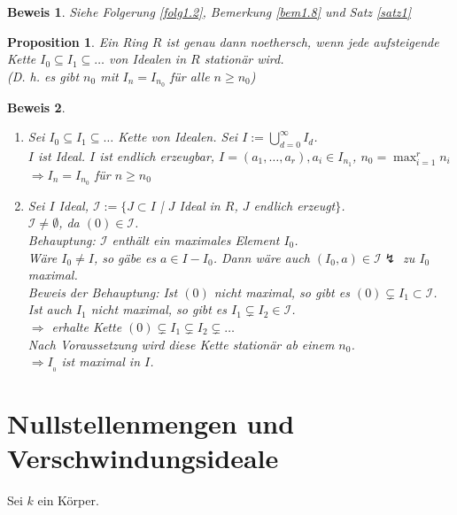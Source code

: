 \documentclass[a4paper,12pt]{report}
\theoremstyle{break}
\newtheorem{Prop}[Def]{Proposition}
\theoremstyle{nonumberbreak}
\newtheorem{Bew}{Beweis}
\theoremstyle{nonumberplain}
\newcommand{\quot}[1]{\textrm{\glqq}{#1}\textrm{\grqq}}
\newenvironment{twosidedproof}{\begin{enumerate}[\quot{$\Rightarrow$}:]}{\end{enumerate}}
\newcommand{\proofforward}{\item[\quot{$\Rightarrow$}:]}
\newcommand{\proofreverse}{\item[\quot{$\Leftarrow$}:]}
\begin{document}
\begin{Bew}
Siehe Folgerung \ref{folg1.2}, Bemerkung \ref{bem1.8} und Satz \ref{satz1}
\end{Bew}

\begin{Prop}
Ein Ring $R$ ist genau dann noethersch, wenn jede aufsteigende Kette $I_0 \subseteq I_1 \subseteq \dots$ von Idealen in $R$ station\"ar wird.\\
(D. h. es gibt $n_0$ mit $I_n=I_{n_0}$ f\"ur alle $n\ge n_0$)
\end{Prop}

\begin{Bew}\begin{twosidedproof}
\proofforward
	Sei $I_0 \subseteq I_1 \subseteq \dots $ Kette von Idealen. Sei $I:= \bigcup_{d=0}^{\infty} I_d$.\\
	$I$ ist Ideal. $I$ ist endlich erzeugbar, $I=(a_1,\dots ,a_r),a_i \in I_{n_1}$, $n_0=\max_{i=1}^r n_i$\\
	$\Rightarrow I_n = I_{n_0}$ f\"ur $n \ge n_0$
	
\proofreverse
	Sei $I$ Ideal, $\mathcal{I}:=\{ J\subset I$ | $J$ Ideal in $R$, $J$ endlich erzeugt$\}$.\\
	$\mathcal{I} \not= \emptyset$, da $(0)\in \mathcal{I}$.\\
	\emph{Behauptung:} $\mathcal{I}$ enth\"alt ein maximales Element $I_0$.\\
	W\"are $I_0 \not= I$, so g\"abe es $a\in I - I_0$. Dann w\"are auch $(I_0,a)\in \mathcal{I} \lightning$ zu $I_0$ maximal.\\
	\emph{Beweis der Behauptung:} Ist $(0)$ nicht maximal, so gibt es $(0)\subsetneq I_1 \subset \mathcal{I}$.\\
	Ist auch $I_1$ nicht maximal, so gibt es $I_1 \subsetneq I_2 \in \mathcal{I}$.\\
	$\Rightarrow$ erhalte Kette $(0) \subsetneq I_1 \subsetneq I_2 \subsetneq \dots $\\
	Nach Voraussetzung wird diese Kette station\"ar ab einem $n_0$.\\
	$\Rightarrow I_{_0}$ ist maximal in $I$.
\end{twosidedproof}\end{Bew}

\newpage
\section{Nullstellenmengen und Verschwindungsideale}
Sei $k$ ein K\"orper.
\end{document}
